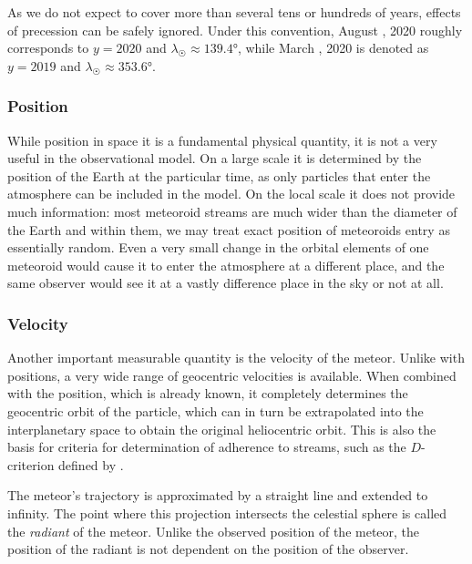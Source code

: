             As we do not expect to cover more than several tens or hundreds of years, effects of precession can be safely ignored.
            Under this convention, August , 2020 roughly corresponds to $y = 2020$ and $\lambda_\Sun \approx \ang{139.4}$,
            while March , 2020 is denoted as $y = 2019$ and $\lambda_\Sun \approx \ang{353.6}$.

        \subsubsection{Position} \label{mspp}
            While position in space it is a fundamental physical quantity,
            it is not a very useful in the observational model.
            On a large scale it is determined by the position of the Earth at the particular time,
            as only particles that enter the atmosphere can be included in the model.
            On the local scale it does not provide much information: most meteoroid streams
            are much wider than the diameter of the Earth and within them,
            we may treat exact position of meteoroids entry as essentially random.
            Even a very small change in the orbital elements of one meteoroid
            would cause it to enter the atmosphere at a different place,
            and the same observer would see it at a vastly difference place in the sky or not at all.

        \subsubsection{Velocity} \label{mspv}
            Another important measurable quantity is the velocity of the meteor.
            Unlike with positions, a very wide range of geocentric velocities is available.
            When combined with the position, which is already known, it completely determines the geocentric
            orbit of the particle, which can in turn be extrapolated into the interplanetary space
            to obtain the original heliocentric orbit.
            This is also the basis for criteria for determination of adherence to streams,
            such as the $D$-criterion defined by \citet{southworth+1963}.

            The meteor's trajectory is approximated by a straight line and extended to infinity.
            The point where this projection intersects the celestial sphere is called the \emph{radiant} of the meteor.
            Unlike the observed position of the meteor, the position of the radiant is not dependent on
            the position of the observer.

